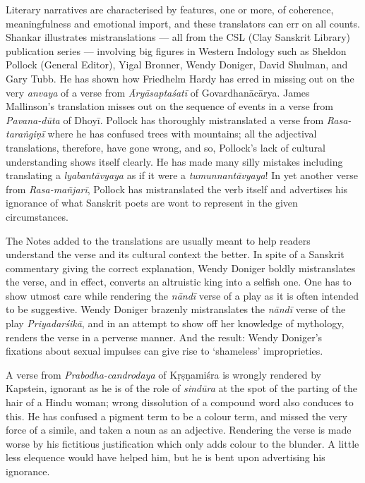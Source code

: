 Literary narratives are characterised by features, one or more, of coherence, meaningfulness and emotional import, and these translators can err on all counts. Shankar illustrates mistranslations --- all from the CSL (Clay Sanskrit Library) publication series --- involving big figures in Western Indology such as Sheldon Pollock (General Editor), Yigal Bronner, Wendy Doniger, David Shulman, and Gary Tubb. He has shown how Friedhelm Hardy has erred in missing out on the very \textsl{anvaya} of a verse from \textsl{Āryāsaptaśatī} of Govardhanācārya. James Mallinson’s translation misses out on the sequence of events in a verse from \textsl{Pavana-dūta} of Dhoyī. Pollock has thoroughly mistranslated a verse from \textsl{Rasa-taraṅgiṇī} where he has confused trees with mountains; all the adjectival translations, therefore, have gone wrong, and so, Pollock’s lack of cultural understanding shows itself clearly. He has made many silly mistakes including translating a \textsl{lyabantāvyaya} as if it were a \textsl{tumunnantāvyaya}! In yet another verse from \textsl{Rasa-mañjarī}, Pollock has mistranslated the verb itself and advertises his ignorance of what Sanskrit poets are wont to represent in the given circumstances.

The Notes added to the translations are usually meant to help readers understand the verse and its cultural context the better. In spite of a Sanskrit commentary giving the correct explanation, Wendy Doniger
 boldly mistranslates the verse, and in effect, converts an altruistic king into a selfish one. One has to show utmost care while rendering the \textsl{nāndī} verse of a play as it is often intended to be suggestive. Wendy Doniger brazenly mistranslates the \textsl{nāndī} verse of the play \textsl{Priyadarśikā}, and in an attempt to show off her knowledge of mythology, renders the verse in a perverse manner. And the result: Wendy Doniger’s fixations about sexual impulses can give rise to ‘shameless’ improprieties.

A verse from \textsl{Prabodha-candrodaya} of Kṛṣṇamiśra is wrongly rendered by Kapstein, ignorant as he is of the role of \textsl{sindūra} at the spot of the parting of the hair of a Hindu woman; wrong dissolution of a compound word also conduces to this. He has confused a pigment term to be a colour term, and missed the very force of a simile, and taken a noun as an adjective. Rendering the verse is made worse by his fictitious justification which only adds colour to the blunder. A little less elequence would have helped him, but he is bent upon advertising his ignorance.

